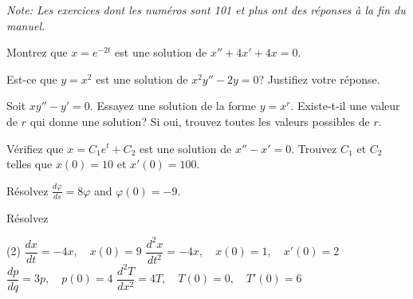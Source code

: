 \noindent
\emph{Note: Les exercices dont les numéros sont 101 et plus ont des réponses à la fin du manuel.}


\setcounter{exercise}{100}

\begin{exercise}
	Montrez que $x = e^{-2t}$ est une solution de $x'' + 4x' + 4x = 0$.
\end{exercise}

\begin{exercise}
	Est-ce que $y = x^2$ est une solution de $x^2y'' - 2y = 0$?  Justifiez votre réponse.
\end{exercise}

\begin{exercise}
	Soit $xy'' - y' = 0$.  Essayez une solution de la forme $y = x^r$.  Existe-t-il une valeur de $r$ qui donne une solution?  Si oui, trouvez toutes les valeurs possibles de $r$.
\end{exercise}


\begin{exercise}
Vérifiez que $x=C_1e^t+C_2$ est une solution de $x''-x' = 0$.  Trouvez $C_1$ et 
$C_2$ telles que $x(0) = 10$ et $x'(0) = 100$.
\end{exercise}

\begin{exercise}
	Résolvez $\frac{d\varphi}{ds} = 8 \varphi$ and $\varphi(0) = -9$.
\end{exercise}

\begin{exercise}
	Résolvez
	\begin{tasks}(2)
	\task $\dfrac{dx}{dt} = -4x, \quad x(0)=9$
	\task $\dfrac{d^2x}{dt^2} = -4x, \quad x(0)=1, \quad x'(0)=2$
	\task $\dfrac{dp}{dq} = 3 p, \quad p(0)=4$
	\task $\dfrac{d^2T}{dx^2} = 4 T, \quad T(0)=0, \quad T'(0)=6$
	\end{tasks}
\end{exercise}


